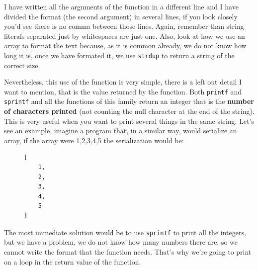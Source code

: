 \documentclass[a4paper]{article}
\begin{document}
I have written all the arguments of the function in a different line and I have
divided the format (the second argument) in several lines, if you look closely
you'd see there is no comma between those lines. Again, remember than string
literals separated just by whitespaces are just one. Also, look at how we use
an array to format the text because, as it is common already, we do not know
how long it is, once we have formated it, we use \verb"strdup" to return a
string of the correct size.

Nevertheless, this use of the function is very simple, there is a left out
detail I want to mention, that is the value returned by the function. Both
\verb!printf! and \verb!sprintf! and all the functions of this family return an
integer that is the \textbf{number of characters printed} (not counting the
null character at the end of the string). This is very useful when you want to
print several things in the same string. Let's see an example, imagine a
program that, in a similar way, would serialize an array, if the array were
{1,2,3,4,5} the serialization would be:

\begin{figure}[H]
\begin{verbatim}
[
    1,
    2,
    3,
    4,
    5
]
\end{verbatim}
\end{figure}
The most immediate solution would be to use \verb!sprintf! to print all the
integers, but we have a problem, we do not know how many numbers there are,
so we cannot write the format that the function needs. That's why we're going
to print on a loop in the return value of the function.
\end{document}
